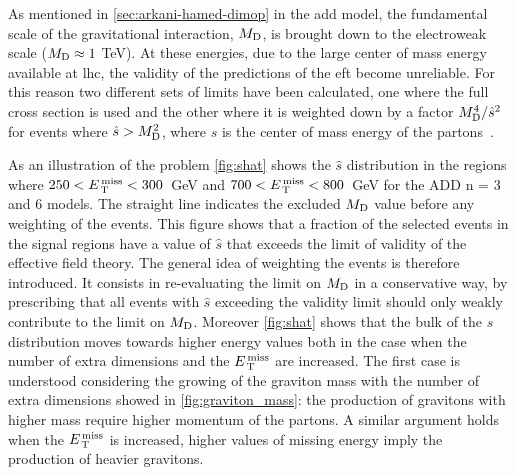 As mentioned in \cref{sec:arkani-hamed-dimop} in the \gls{add} model, the
fundamental scale of the gravitational interaction, $M_\mathrm{D}$, is brought down to
the electroweak scale ($M_\mathrm{D} \approx 1~$TeV). At these energies, due to the large
center of mass energy available at \gls{lhc}, the validity of the predictions of
the \gls{eft} become unreliable. For this reason two different sets of limits
have been calculated, one where the full cross section is used and the other
where it is weighted down by a factor $M_\mathrm{D}^4/\hat{s}^2$ for events where
$\hat{s} > M_\mathrm{D}^2$, where $\hat{s}$ is the center of mass energy of the
partons~\cite{LEDWeightFactor}.

As an illustration of the problem \cref{fig:shat} shows the $\hat{s}$
distribution in the regions where $250 < E_\mathrm{\, T}^\mathrm{\, miss} < 300$~GeV and
$700 < E_\mathrm{\, T}^\mathrm{\, miss} < 800$~GeV for the ADD n = 3 and 6 models. The straight line
indicates the excluded $M_\mathrm{D}$ value before any weighting of the events. This
figure shows that a fraction of the selected events in the signal regions have a
value of $\hat{s}$ that exceeds the limit of validity of the effective field
theory. The general idea of weighting the events is therefore introduced. It
consists in re-evaluating the limit on $M_\mathrm{D}$ in a conservative way, by
prescribing that all events with $\hat{s}$ exceeding the validity limit should
only weakly contribute to the limit on $M_\mathrm{D}$. Moreover \cref{fig:shat} shows
that the bulk of the $\hat{s}$ distribution moves towards higher energy values
both in the case when the number of extra dimensions and the $E_\mathrm{\, T}^\mathrm{\, miss}$ are
increased. The first case is understood considering the growing of the graviton
mass with the number of extra dimensions showed in \cref{fig:graviton_mass}:
the production of gravitons with higher mass require higher momentum of the
partons. A similar argument holds when the $E_\mathrm{\, T}^\mathrm{\, miss}$ is increased, higher values of
missing energy imply the production of heavier gravitons.

